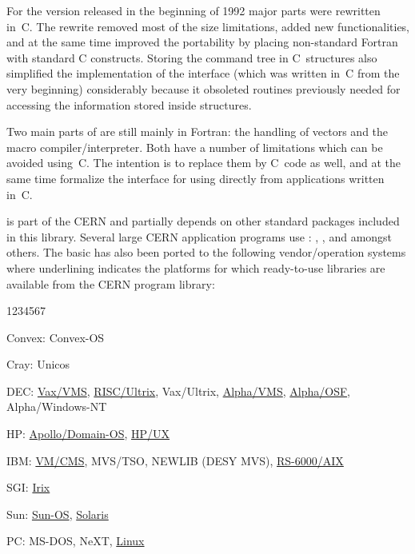For the \KUIP{} version released in the beginning of 1992 major parts
were rewritten in~C.
The rewrite removed most of the size limitations, added new
functionalities, and at the same time improved the portability by placing
non-standard Fortran with standard C constructs.
Storing the command tree in C~structures also simplified the
implementation of the \Motif{} interface (which was written in~C from the
very beginning) considerably because it obsoleted routines previously
needed for accessing the information stored inside \ZEBRA{}
structures.

Two main parts of \KUIP{} are still mainly in Fortran: the handling of
vectors and the macro compiler/interpreter.
Both have a number of limitations which can be avoided using~C.
The intention is to replace them by C~code as well, and at the same
time formalize the interface for using \KUIP{} directly from applications
written in~C.

\KUIP{} is part of the CERN \PACKLIB{} and partially depends on other
standard packages included in this library.
Several large CERN application programs use \KUIP{}:
\PAW{}\cite{bib-PAW}, \GEANT{}\cite{bib-GEANT}, and \CMZ{}\cite{bib-CMZ} 
amongst others.
The basic \KUIP{} has also been ported to the following
vendor/operation systems where underlining indicates the platforms for
which ready-to-use libraries are available from the CERN program library:
\begin{DL}{1234567}
\item[Convex:]
Convex-OS
\item[Cray:]
Unicos
\item[DEC:]
\underline{\vphantom{p}Vax/VMS},
\underline{\vphantom{p}RISC/Ultrix}, 
Vax/Ultrix,
\underline{Alpha/VMS},
\underline{Alpha/OSF}, 
Alpha/Windows-NT
\item[HP:]
\underline{Apollo/Domain-OS},
\underline{\vphantom{p}HP/UX}
\item[IBM:]
\underline{\vphantom{p}VM/CMS}, 
MVS/TSO, 
NEWLIB (DESY MVS),
\underline{\vphantom{p}RS-6000/AIX}
\item[SGI:]
\underline{\vphantom{p}Irix}
\item[Sun:]
\underline{\vphantom{p}Sun-OS}, 
\underline{\vphantom{p}Solaris}
\item[PC:]
MS-DOS, 
NeXT,
\underline{\vphantom{p}Linux}
\end{DL}

